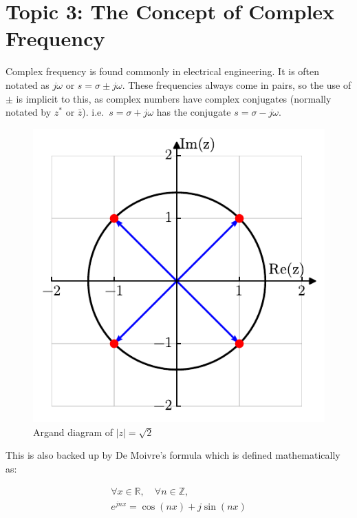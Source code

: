 \documentclass[
  12pt,
  a4paper,
]{report}
\begin{document}
\newpage{}

\section{Topic 3: The Concept of Complex
Frequency}\label{topic-3-the-concept-of-complex-frequency}

Complex frequency is found commonly in electrical engineering. It is
often notated as \(j\omega\) or \(s = \sigma \pm j\omega\). These
frequencies always come in pairs, so the use of \(\pm\) is implicit to
this, as complex numbers have complex conjugates (normally notated by
\(z^*\) or \(\bar{z}\)). i.e.~\(s = \sigma + j\omega\) has the conjugate
\(s=\sigma - j\omega\).

\begin{figure}

{\centering \includegraphics{index_files/figure-pdf/argand-output-1.pdf}

}

\caption{Argand diagram of \(|z| = \sqrt{2}\)}

\end{figure}%

This is also backed up by De Moivre's formula which is defined
mathematically as:

\begin{gather}
    \label{eq:de-moivre-formula}
    \forall x \in \mathbb{R}, \quad \forall n \in \mathbb{Z}, \\
    e^{jnx} = \cos(n x) + j \sin(n x)  
\end{gather}
\end{document}
